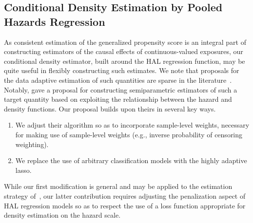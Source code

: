\subsection{Conditional Density Estimation by Pooled Hazards Regression}

As consistent estimation of the generalized propensity score is an integral part
of constructing estimators of the causal effects of continuous-valued exposures,
our conditional density estimator, built around the HAL regression function, may
be quite useful in flexibly constructing such estimates. We note that proposals
for the data adaptive estimation of such quantities are sparse in the
literature~\citep[e.g.,][]{zhu2015boosting}. Notably, \citet{diaz2011super} gave
a proposal for constructing semiparametric estimators of such a target quantity
based on exploiting the relationship between the hazard and density functions.
Our proposal builds upon theirs in several key ways.

\begin{enumerate}
  \item We adjust their algorithm so as to incorporate sample-level weights,
     necessary for making use of sample-level weights (e.g., inverse probability
     of censoring weighting).
  \item We replace the use of arbitrary classification models with the highly
  adaptive lasso.
\end{enumerate}

While our first modification is general and may be applied to the estimation
strategy of~\citet{diaz2011super}, our latter contribution requires adjusting
the penalization aspect of HAL regression models so as to respect the use of
a loss function appropriate for density estimation on the hazard scale.


